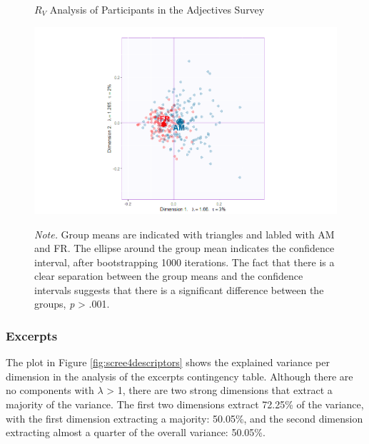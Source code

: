 \documentclass[
  english,
  man,floatsintext]{apa6}
\begin{document}
\begin{figure}   
  \centering  
  \caption{${R_V}$ Analysis of Participants in the Adjectives Survey}
    \includegraphics[width=0.7\columnwidth]{./Music-Descriptor-Space_files/figure-latex/apartrvmap.png}
  \label{fig:map4RVA}
  \caption*{\footnotesize \textit{Note.}  Group means are indicated with triangles and labled with AM and FR. The ellipse around the group mean indicates the confidence interval, after bootstrapping 1000 iterations. The fact that there is a clear separation between the group means and the confidence intervals suggests that there is a significant difference between the groups, \textit{p} > .001.}
\end{figure}

\hypertarget{excerpts-1}{%
\subsubsection{Excerpts}\label{excerpts-1}}

The plot in Figure \ref{fig:scree4descriptors} shows the explained variance per dimension in the analysis of the excerpts contingency table. Although there are no components with \(\lambda\) \textgreater{} 1, there are two strong dimensions that extract a majority of the variance. The first two dimensions extract 72.25\% of the variance, with the first dimension extracting a majority: 50.05\%, and the second dimension extracting almost a quarter of the overall variance: 50.05\%.
\end{document}
